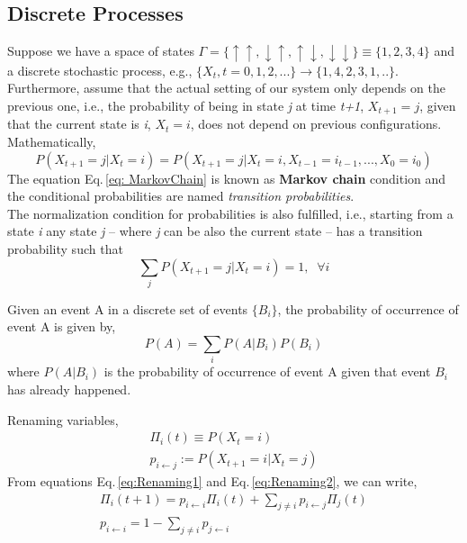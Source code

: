 \subsection{Discrete Processes}
Suppose we have a space of states $\Gamma = \{\uparrow \uparrow,\downarrow \uparrow,\uparrow \downarrow,\downarrow \downarrow \} \equiv \{1, 2, 3, 4 \}$ and a discrete stochastic process, e.g., $\{X_{t}, t= 0,1,2,...\} \rightarrow \{1,4,2,3,1,..\}$. Furthermore, assume that the actual setting of our system only depends on the previous one, i.e., the probability of being in state \textit{j} at time \textit{t+1}, $X_{t+1}= j$, given that the current state is \textit{i}, $X_{t} = i$, does not depend on previous configurations.\\
Mathematically,
\begin{equation}
\label{eq: MarkovChain}
    P\left(X_{t+1} = j | X_{t} = i\right) = P\left(X_{t+1}=j | X_{t} = i, X_{t-1} =i_{t-1},...,X_{0} = i_{0}\right)
\end{equation}
The equation Eq.\,\eqref{eq: MarkovChain} is known as \textbf{Markov chain} condition and the conditional probabilities are named \textit{transition probabilities}.\\
The normalization condition for probabilities is also fulfilled, i.e., starting from a state  \textit{i} any state \textit{j} -- where \textit{j} can be also the current state -- has a transition probability such that
\begin{equation}
    \sum_{j}P\left(X_{t+1} = j | X_{t} = i\right) = 1, \;\; \forall i
\end{equation}
\begin{theorem}
Given an event A in a discrete set of events $\{B_{i}\}$, the probability of occurrence of event A is given by,
\begin{equation}
    P\left(A\right) = \sum_{i}P\left(A|B_{i}\right)P\left(B_{i}\right)
\end{equation}
where $P\left(A|B_{i}\right)$ is the probability of occurrence of event A given that event $B_{i}$ has already happened. 
\end{theorem}
Renaming variables,
\begin{align}
    \label{eq:Renaming1}
    \Pi_{i}(t) \equiv P\left(X_{t} = i\right) \\
    \label{eq:Renaming2}
    p_{i \leftarrow j} := P\left(X_{t+1} = i | X_{t}=j\right)
\end{align}
From equations Eq.\,\eqref{eq:Renaming1} and Eq.\,\eqref{eq:Renaming2}, we can write,
\begin{align}
        \Pi_{i}(t+1) = p_{i \leftarrow i}\Pi_{i}(t) + \sum_{j \neq i} p_{i \leftarrow j}\Pi_{j}(t) \\ 
        p_{i \leftarrow i} = 1 - \sum_{j\neq i}p_{j \leftarrow i}
\end{align}
